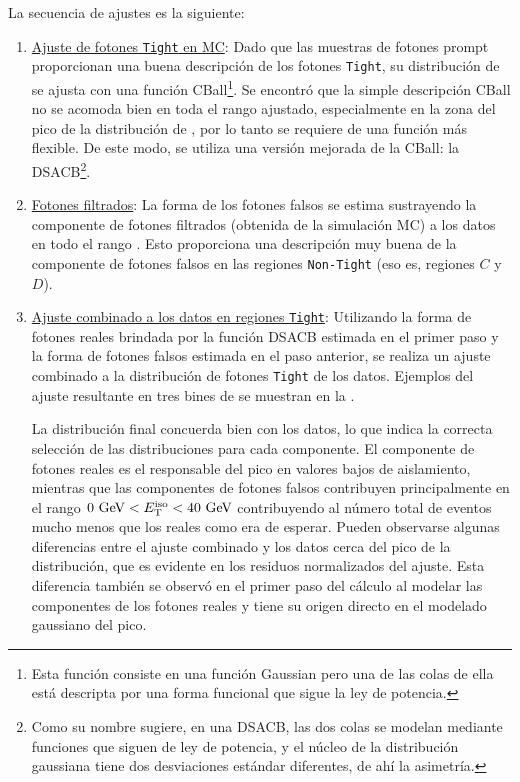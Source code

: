 La secuencia de ajustes es la siguiente:
\begin{enumerate}
    \item \underline{Ajuste de fotones \texttt{Tight} en \ac{MC}}: Dado que las muestras de fotones prompt proporcionan una buena descripción de los fotones \texttt{Tight}, su distribución de \etiso se ajusta con una función \ac{CBall}\footnote{Esta función consiste en una función Gaussian pero una de las colas de ella está descripta por una forma funcional que sigue la ley de potencia.}. Se encontró que la simple descripción \ac{CBall} no se acomoda bien en toda el rango ajustado, especialmente en la zona del pico de la distribución de \etiso, por lo tanto se requiere de una función más flexible. De este modo, se utiliza una versión mejorada de la \ac{CBall}: la \ac{DSACB}\footnote{Como su nombre sugiere, en una \ac{DSACB}, las dos colas se modelan mediante funciones que siguen de ley de potencia, y el núcleo de la distribución gaussiana tiene dos desviaciones estándar diferentes, de ahí la asimetría.}.
    \item \underline{Fotones filtrados}: La forma de los fotones falsos se estima sustrayendo la componente de fotones filtrados (obtenida de la simulación \ac{MC}) a los datos en todo el rango \etiso. Esto proporciona una descripción muy buena de la componente de fotones falsos en las regiones \texttt{Non-Tight} (eso es, regiones \(C\) y \(D\)).
    \item \underline{Ajuste combinado a los datos en regiones \texttt{Tight}}: Utilizando la forma de fotones reales brindada por la función \ac{DSACB} estimada en el primer paso y la forma de fotones falsos estimada en el paso anterior, se realiza un ajuste combinado a la distribución \etiso de fotones \texttt{Tight} de los datos. Ejemplos del ajuste resultante en tres bines de \pt se muestran en la \Fig{\ref{fig:bkg:estimation:fits_tightID_data}}.
    
        La distribución final concuerda bien con los datos, lo que indica la correcta selección de las distribuciones para cada componente. El componente de fotones reales es el responsable del pico en valores bajos de aislamiento, mientras que las componentes de fotones falsos contribuyen principalmente en el rango \(0~\text{GeV} < E_{\text{T}}^{\text{iso}} < 40 ~\text{GeV}\) contribuyendo al número total de eventos mucho menos que los reales como era de esperar. Pueden observarse algunas diferencias entre el ajuste combinado y los datos cerca del pico de la distribución, que es evidente en los residuos normalizados del ajuste. Esta diferencia también se observó en el primer paso del cálculo al modelar las componentes de los fotones reales y tiene su origen directo en el modelado gaussiano del pico.


\end{enumerate}

